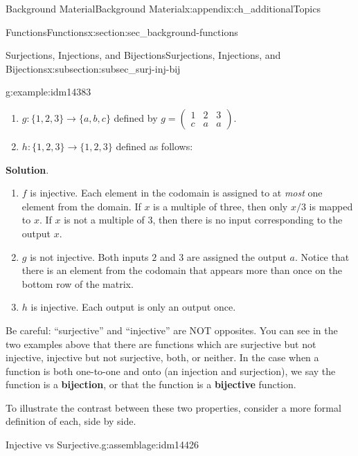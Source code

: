 \documentclass[oneside,10pt,]{book}
\newcommand{\terminology}[1]{\textbf{#1}}
\numberwithin{equation}{chapter}
\newcommand{\amp}{&}
\begin{document}
\begin{appendixptx}{Background Material}{}{Background Material}{}{}{x:appendix:ch_additionalTopics}
\begin{sectionptx}{Functions}{}{Functions}{}{}{x:section:sec_background-functions}
\begin{subsectionptx}{Surjections, Injections, and Bijections}{}{Surjections, Injections, and Bijections}{}{}{x:subsection:subsec_surj-inj-bij}
\begin{example}{}{g:example:idm14383}
\begin{enumerate}
\item{}\(g: \{1,2,3\} \to \{a,b,c\}\) defined by \(g = \begin{pmatrix}1 \amp 2 \amp 3 \\ c \amp a \amp a \end{pmatrix}\).%
\item{}\(h:\{1,2,3\} \to \{1,2,3\}\) defined as follows:%
\begin{sidebyside}{1}{0.4}{0.4}{0}%
\begin{sbspanel}{0.2}%
%
\end{sbspanel}%
\end{sidebyside}%
\end{enumerate}
%
\par\smallskip%
\noindent\textbf{Solution}.\hypertarget{g:solution:idm14400}{}\quad{}%
\begin{enumerate}
\item{}\(f\) is injective. Each element in the codomain is assigned to at \emph{most} one element from the domain. If \(x\) is a multiple of three, then only \(x/3\) is mapped to \(x\). If \(x\) is not a multiple of 3, then there is no input corresponding to the output \(x\).%
\item{}\(g\) is not injective. Both inputs \(2\) and \(3\) are assigned the output \(a\). Notice that there is an element from the codomain that appears more than once on the bottom row of the matrix.%
\item{}\(h\) is injective. Each output is only an output once.%
\end{enumerate}
%
\end{example}
Be careful: ``surjective'' and ``injective'' are NOT opposites.  You can see in the two examples above that there are functions which are surjective but not injective, injective but not surjective, both, or neither. In the case when a function is both one-to-one and onto (an injection and surjection), we say the function is a \terminology{bijection}, or that the function is a \terminology{bijective} function.%
\par
To illustrate the contrast between these two properties, consider a more formal definition of each, side by side.%
\begin{assemblage}{Injective vs Surjective.}{g:assemblage:idm14426}%

\end{assemblage}
\end{subsectionptx}
\end{sectionptx}
\end{appendixptx}
\end{document}
